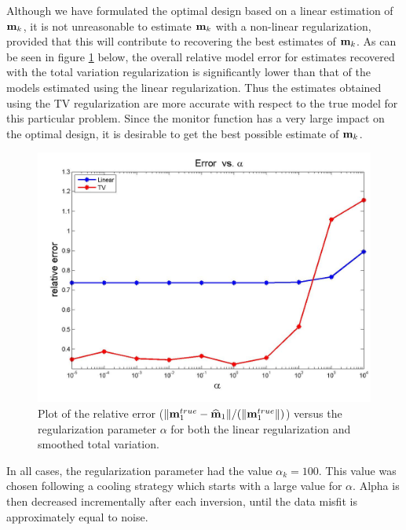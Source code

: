 \documentclass[11pt]{article}
\newcommand{\bfm}	{{\bf{m}}}
\newcommand{\bfmhat}    {{\widehat{\bfm}}}
\begin{document}
Although we have formulated the optimal design based on a linear estimation of $\bfm_k$, it is not unreasonable to estimate $\bfm_k$  with a non-linear regularization, provided that this will contribute to recovering the best estimates of $\bfm_k$. As can be seen in figure \ref{fig:erro1} below, the overall relative model error for estimates recovered with the total variation regularization is significantly lower than that of the models estimated using the linear regularization. Thus the estimates obtained using the TV regularization are more accurate with respect to the true model for this particular problem. 
Since the monitor function has a very large impact on the optimal design, it is desirable to get the best possible estimate of $\bfm_k$. 
%
\begin{figure}
\begin{center}
\iwidth=180mm
\includegraphics[width=.75\iwidth]{figures/newFigs/exp2-error1}
\end{center}
\caption{Plot of the relative error ($\|\bfm_1^{true}-\bfmhat_1\|/(    \|\bfm^{true}_1\|)$) versus the regularization parameter $\alpha$ for both the linear regularization and smoothed total variation. }
	\label{fig:erro1}
\end{figure} 

In all cases, the regularization parameter had the value $\alpha_k = 100$. This value was chosen following a cooling strategy which starts with a large value for $\alpha$. Alpha is then decreased incrementally after each inversion, until the data misfit is approximately equal to noise.
\end{document}
